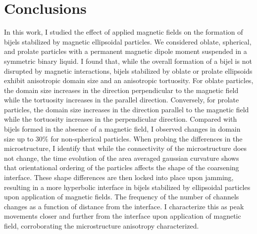 \section{Conclusions}

In this work, I studied the effect of applied magnetic fields on the
formation of bijels stabilized by magnetic ellipsoidal particles. We
considered oblate, spherical, and prolate particles with a permanent
magnetic dipole moment suspended in a symmetric binary liquid. I found
that, while the overall formation of a bijel is not disrupted by
magnetic interactions, bijels stabilized by oblate or prolate ellipsoids
exhibit anisotropic domain size and an anisotropic tortuosity. For
oblate particles, the domain size increases in the direction
perpendicular to the magnetic field while the tortuosity increases in
the parallel direction. Conversely, for prolate particles, the domain
size increases in the direction parallel to the magnetic field while the
tortuosity increases in the perpendicular direction. Compared with
bijels formed in the absence of a magnetic field, I observed changes in
domain size up to \(30\%\) for non-spherical particles. When probing
the differences in the microstructure, I identify that while the
connectivity of the microstructure does not change, 
the time evolution of the area averaged gaussian curvature shows that
orientational ordering of the particles affects the shape of the
coarsening interface. These shape differences are then locked into place
upon jamming, resulting in a more hyperbolic interface in bijels stabilized
by ellipsoidal particles upon application of magnetic fields. The frequency 
of the number of channels changes as a function of distance from the interface. I
characterize this as peak movements closer and further from the interface upon application of magnetic
field, corroborating the microstructure anisotropy characterized.

